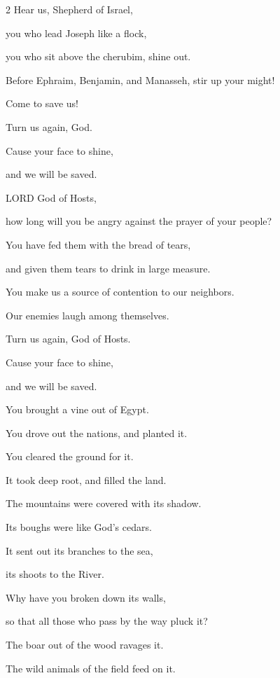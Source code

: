 \begin{multicols}{2}
	\myverse*{}Hear us, Shepherd of Israel,
	
	you who lead Joseph like a flock,
	
	you who sit above the cherubim, shine out.
	
	
	\myverse{}Before Ephraim, Benjamin, and Manasseh, stir up your might!
	
	Come to save us!
	
	
	\myverse{}Turn us again, God.
	
	Cause your face to shine,
	
	and we will be saved.
	
	\vspace{\baselineskip}
	
	\myverse{}LORD God of Hosts,
	
	how long will you be angry against the prayer of your people?
	
	
	\myverse{}You have fed them with the bread of tears,
	
	and given them tears to drink in large measure.
	
	
	\myverse{}You make us a source of contention to our neighbors.
	
	Our enemies laugh among themselves.
	
	
	\myverse{}Turn us again, God of Hosts.
	
	Cause your face to shine,
	
	and we will be saved.
	
	\vspace{\baselineskip}
	
	\myverse{}You brought a vine out of Egypt.
	
	You drove out the nations, and planted it.
	
	
	\myverse{}You cleared the ground for it.
	
	It took deep root, and filled the land.
	
	
	\myverse{}The mountains were covered with its shadow.
	
	Its boughs were like God’s cedars.
	
	
	\myverse{}It sent out its branches to the sea,
	
	its shoots to the River.
	
	
	\myverse{}Why have you broken down its walls,
	
	so that all those who pass by the way pluck it?
	
	
	\myverse{}The boar out of the wood ravages it.
	
	The wild animals of the field feed on it.
	

\end{multicols}
